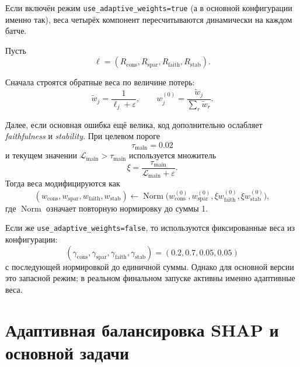 \documentclass[11pt]{article}
\begin{document}
Если включён режим \texttt{use\_adaptive\_weights=true} (а в основной конфигурации именно так), веса четырёх компонент пересчитываются динамически на каждом батче.

Пусть
\begin{equation}
\boldsymbol{\ell} = (R_{\mathrm{cons}}, R_{\mathrm{spar}}, R_{\mathrm{faith}}, R_{\mathrm{stab}}).
\end{equation}

Сначала строятся обратные веса по величине потерь:
\begin{equation}
\tilde{w}_j = \frac{1}{\ell_j + \varepsilon},
\qquad
w_j^{(0)} = \frac{\tilde{w}_j}{\sum_{r} \tilde{w}_r}.
\end{equation}

Далее, если основная ошибка ещё велика, код дополнительно ослабляет \textit{faithfulness} и \textit{stability}. При целевом пороге
\begin{equation}
\tau_{\mathrm{main}} = 0.02
\end{equation}
и текущем значении $\mathcal{L}_{\mathrm{main}} > \tau_{\mathrm{main}}$ используется множитель
\begin{equation}
\xi = \frac{\tau_{\mathrm{main}}}{\mathcal{L}_{\mathrm{main}} + \varepsilon}.
\end{equation}
Тогда веса модифицируются как
\begin{equation}
(w_{\mathrm{cons}}, w_{\mathrm{spar}}, w_{\mathrm{faith}}, w_{\mathrm{stab}})
\leftarrow
\operatorname{Norm}
\bigl(
 w_{\mathrm{cons}}^{(0)},
 w_{\mathrm{spar}}^{(0)},
 \xi w_{\mathrm{faith}}^{(0)},
 \xi w_{\mathrm{stab}}^{(0)}
\bigr),
\end{equation}
где $\operatorname{Norm}$ означает повторную нормировку до суммы 1.

Если же \texttt{use\_adaptive\_weights=false}, то используются фиксированные веса из конфигурации:
\begin{equation}
(\gamma_{\mathrm{cons}}, \gamma_{\mathrm{spar}}, \gamma_{\mathrm{faith}}, \gamma_{\mathrm{stab}})
= (0.2, 0.7, 0.05, 0.05)
\end{equation}
с последующей нормировкой до единичной суммы. Однако для основной версии это запасной режим; в реальном финальном запуске активны именно адаптивные веса.

\section{Адаптивная балансировка SHAP и основной задачи}
\end{document}
